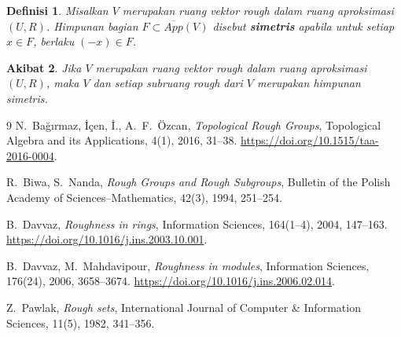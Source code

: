 \documentclass[a4paper,11pt]{article}
\theoremstyle{plain}
\newtheorem{definisi}{Definisi}
\newtheorem{akibat}[definisi]{Akibat}
\newcommand{\upp}[1]{\overline{App}(#1)}
\begin{document}
\begin{definisi}\label{def:33}
      Misalkan $V$ merupakan ruang vektor rough dalam ruang aproksimasi
      $(U,R)$. Himpunan bagian $F\subset\upp{V}$ disebut
      \textbf{simetris} apabila untuk setiap $x\in F$, berlaku $(-x)\in F$.
\end{definisi}

\begin{akibat}\label{cor:34}
      Jika $V$ merupakan ruang vektor rough dalam ruang aproksimasi $(U,R)$,
      maka $V$ dan setiap subruang rough dari $V$ merupakan himpunan simetris.
\end{akibat}

\begin{thebibliography}{9}
      N.~Ba\u{g}{\i}rmaz, \.{I}\c{c}en, \.{I}., A.~F.~\"Ozcan,
      \textit{Topological Rough Groups},
      Topological Algebra and its Applications, 4(1), 2016, 31--38.
      \url{https://doi.org/10.1515/taa-2016-0004}.

      R.~Biwa, S.~Nanda,
      \textit{Rough Groups and Rough Subgroups},
      Bulletin of the Polish Academy of Sciences--Mathematics,
      42(3), 1994, 251--254.

      B.~Davvaz, \textit{Roughness in rings},
      Information Sciences, 164(1--4), 2004, 147--163.
      \url{https://doi.org/10.1016/j.ins.2003.10.001}.

      B.~Davvaz, M.~Mahdavipour, \textit{Roughness in modules},
      Information Sciences, 176(24), 2006, 3658--3674.
      \url{https://doi.org/10.1016/j.ins.2006.02.014}.

      Z.~Pawlak, \textit{Rough sets},
      International Journal of Computer \& Information Sciences,
      11(5), 1982, 341--356.
\end{thebibliography}
\end{document}
